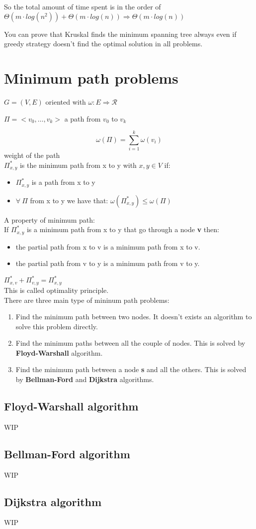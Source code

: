 \documentclass{article}
\begin{document}
So the total amount of time spent is in the order of $\Theta(m\cdot log(n^2)) + \Theta(m\cdot log(n)) \Rightarrow \Theta(m\cdot log(n))$

You can prove that Kruskal finds the minimum spanning tree always even if greedy strategy doesn't find the optimal solution in all problems.

\section{Minimum path problems}
\begin{large}
$G=(V,E)$ oriented with $\omega:E\Rightarrow \mathcal{R}$

$\Pi = <v_0,\ldots, v_k>$ a path from $v_0$ to $v_k$

$$\omega(\Pi) = \sum_{i=1}^k \omega(v_i)$$ weight of the path\\
$\Pi_{x,y}^*$ is the minimum path from x to y with $x,y \in V$ if:\\
\begin{itemize}
\item $\Pi_{x,y}^*$ is a path from x to y
\item $\forall \ \Pi$ from x to y we have that: $\omega(\Pi_{x,y}^*) \leq \omega(\Pi)$
\end{itemize}
A property of minimum path:\\
If $\Pi_{x,y}^*$ is a minimum path from x to y that go through a node \textbf{v} then:\\
\begin{itemize}
\item the partial path from x to v is a minimum path from x to v.
\item the partial path from v to y is a minimum path from v to y.
\end{itemize}
$\Pi_{x,v}^* + \Pi_{v,y}^* = \Pi_{x,y}^*$ \leavevmode \\ 

This is called optimality principle.\\
There are three main type of mininum path problems:
\begin{enumerate}
\item Find the minimum path between two nodes. It doesn't exists an algorithm to solve this problem directly.
\item Find the minimum paths between all the couple of nodes. This is solved by \textbf{Floyd-Warshall} algorithm.
\item Find the minimum path between a node \textbf{s} and all the others. This is solved by \textbf{Bellman-Ford} and \textbf{Dijkstra} algorithms.
\end{enumerate}

\end{large}

\subsection{Floyd-Warshall algorithm}
WIP
\subsection{Bellman-Ford algorithm}
WIP
\subsection{Dijkstra algorithm}
WIP
\end{document}
